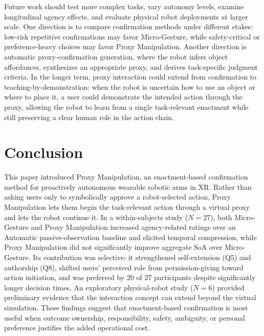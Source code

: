 \documentclass[sigconf,review,anonymous]{acmart}
\begin{document}
Future work should test more complex tasks, vary autonomy levels, examine longitudinal agency effects, and evaluate physical robot deployments at larger scale. One direction is to compare confirmation methods under different stakes: low-risk repetitive confirmations may favor Micro-Gesture, while safety-critical or preference-heavy choices may favor Proxy Manipulation. Another direction is automatic proxy-confirmation generation, where the robot infers object affordances, synthesizes an appropriate proxy, and derives task-specific judgment criteria. In the longer term, proxy interaction could extend from confirmation to teaching-by-demonstration: when the robot is uncertain how to use an object or where to place it, a user could demonstrate the intended action through the proxy, allowing the robot to learn from a single task-relevant enactment while still preserving a clear human role in the action chain.

\section{Conclusion}

This paper introduced Proxy Manipulation, an enactment-based confirmation method for proactively autonomous wearable robotic arms in XR. Rather than asking users only to symbolically approve a robot-selected action, Proxy Manipulation lets them begin the task-relevant action through a virtual proxy and lets the robot continue it. In a within-subjects study ($N=27$), both Micro-Gesture and Proxy Manipulation increased agency-related ratings over an Automatic passive-observation baseline and elicited temporal compression, while Proxy Manipulation did not significantly improve aggregate SoA over Micro-Gesture. Its contribution was selective: it strengthened self-extension (Q5) and authorship (Q8), shifted users' perceived role from permission-giving toward action initiation, and was preferred by 20 of 27 participants despite significantly longer decision times. An exploratory physical-robot study ($N=6$) provided preliminary evidence that the interaction concept can extend beyond the virtual simulation. These findings suggest that enactment-based confirmation is most useful when outcome ownership, responsibility, safety, ambiguity, or personal preference justifies the added operational cost.
\end{document}
